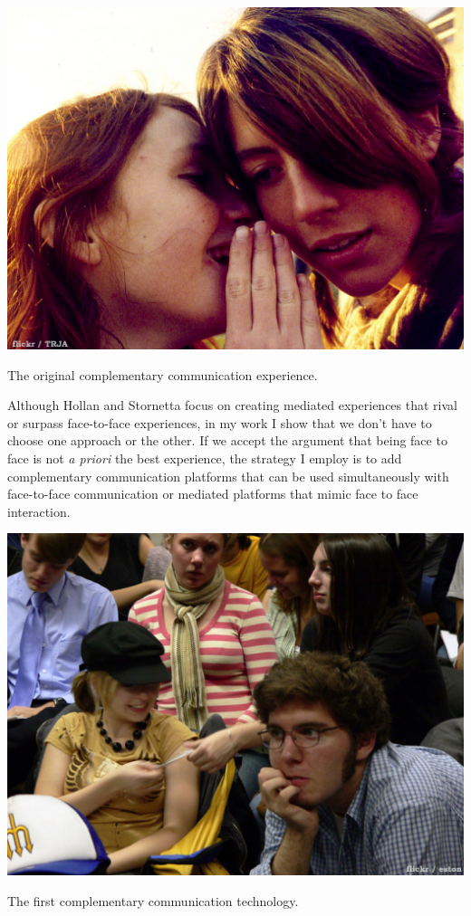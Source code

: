 \begin{marginfigure}
	\includegraphics{figures/whisper.png}
	\caption{The original complementary communication experience.}
	\label{fig:whisper}
\end{marginfigure}


Although Hollan and Stornetta focus on creating mediated experiences that rival or surpass face-to-face experiences, in my work I show that we don't have to choose one approach or the other. If we accept the argument that being face to face is not \emph{a priori} the best experience, the strategy I employ is to add complementary communication platforms that can be used simultaneously with face-to-face communication or mediated platforms that mimic face to face interaction.


\begin{marginfigure}
	\includegraphics{figures/note-passing.png}
	\caption{The first complementary communication technology.}
	\label{fig:notes}
\end{marginfigure}


